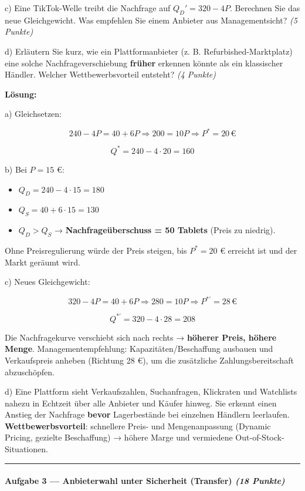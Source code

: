 \documentclass[11pt, a4paper]{article}
\begin{document}
c) Eine TikTok-Welle treibt die Nachfrage auf $Q_D' = 320 - 4P$. Berechnen Sie das neue Gleichgewicht. Was empfehlen Sie einem Anbieter aus Managementsicht? \textit{(5 Punkte)}


d) Erläutern Sie kurz, wie ein Plattformanbieter (z. B. Refurbished-Marktplatz) eine solche Nachfrageverschiebung \textbf{früher} erkennen könnte als ein klassischer Händler. Welcher Wettbewerbsvorteil entsteht? \textit{(4 Punkte)}


\textbf{Lösung:}


a) Gleichsetzen:

\[
240 - 4P = 40 + 6P \Rightarrow 200 = 10P \Rightarrow P^* = 20\,€
\]

\[
Q^* = 240 - 4 \cdot 20 = 160
\]


b) Bei $P = 15$ €:

\begin{itemize}
  \item $Q_D = 240 - 4 \cdot 15 = 180$
  \item $Q_S = 40 + 6 \cdot 15 = 130$
  \item $Q_D > Q_S$ → \textbf{Nachfrageüberschuss = 50 Tablets} (Preis zu niedrig).
\end{itemize}

Ohne Preisregulierung würde der Preis steigen, bis $P^* = 20$ € erreicht ist und der Markt geräumt wird.


c) Neues Gleichgewicht:

\[
320 - 4P = 40 + 6P \Rightarrow 280 = 10P \Rightarrow P^{*\prime} = 28\,€
\]

\[
Q^{*\prime} = 320 - 4 \cdot 28 = 208
\]


Die Nachfragekurve verschiebt sich nach rechts → \textbf{höherer Preis, höhere Menge}. Managementempfehlung: Kapazitäten/Beschaffung ausbauen und Verkaufspreis anheben (Richtung 28 €), um die zusätzliche Zahlungsbereitschaft abzuschöpfen.


d) Eine Plattform sieht Verkaufszahlen, Suchanfragen, Klickraten und Watchlists nahezu in Echtzeit über alle Anbieter und Käufer hinweg. Sie erkennt einen Anstieg der Nachfrage \textbf{bevor} Lagerbestände bei einzelnen Händlern leerlaufen. \textbf{Wettbewerbsvorteil}: schnellere Preis- und Mengenanpassung (Dynamic Pricing, gezielte Beschaffung) → höhere Marge und vermiedene Out-of-Stock-Situationen.



\noindent\textcolor{rulegray}{\rule{\linewidth}{0.4pt}}


\paragraph{Aufgabe 3 — Anbieterwahl unter Sicherheit (Transfer) \textit{(18 Punkte)}}\mbox{}\\[2pt]
\end{document}
